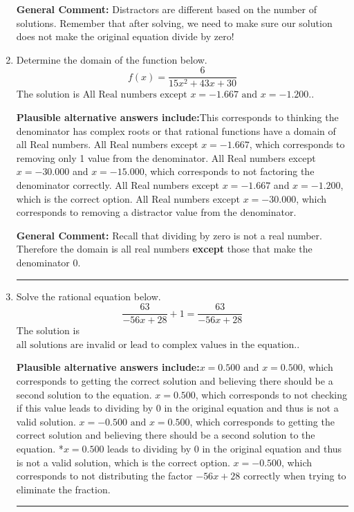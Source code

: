 \documentclass{extbook}[14pt]
\newcommand{\litem}[1]{\item #1

\rule{\textwidth}{0.4pt}}
\begin{document}
\begin{enumerate}
{\textbf{General Comment:} Distractors are different based on the number of solutions. Remember that after solving, we need to make sure our solution does not make the original equation divide by zero!
}
\litem{
Determine the domain of the function below.
\[ f(x) = \frac{6}{15x^{2} +43 x + 30} \]The solution is \( \text{All Real numbers except } x = -1.667 \text{ and } x = -1.200. \).\begin{enumerate}[label=\Alph*.]
\textbf{Plausible alternative answers include:}This corresponds to thinking the denominator has complex roots or that rational functions have a domain of all Real numbers.
All Real numbers except $x = -1.667$, which corresponds to removing only 1 value from the denominator.
All Real numbers except $x = -30.000$ and $x = -15.000$, which corresponds to not factoring the denominator correctly.
All Real numbers except $x = -1.667$ and $x = -1.200$, which is the correct option.
All Real numbers except $x = -30.000$, which corresponds to removing a distractor value from the denominator.
\end{enumerate}

\textbf{General Comment:} Recall that dividing by zero is not a real number. Therefore the domain is all real numbers \textbf{except} those that make the denominator 0.
}
\litem{
Solve the rational equation below.
\[ \frac{63}{-56x + 28} + 1 = \frac{63}{-56x + 28} \]The solution is \( \text{all solutions are invalid or lead to complex values in the equation.} \).\begin{enumerate}[label=\Alph*.]
\textbf{Plausible alternative answers include:}$x = 0.500 \text{ and } x = 0.500$, which corresponds to getting the correct solution and believing there should be a second solution to the equation.
$x = 0.500$, which corresponds to not checking if this value leads to dividing by 0 in the original equation and thus is not a valid solution.
$x = -0.500 \text{ and } x = 0.500$, which corresponds to getting the correct solution and believing there should be a second solution to the equation.
*$x = 0.500$ leads to dividing by 0 in the original equation and thus is not a valid solution, which is the correct option.
$x = -0.500$, which corresponds to not distributing the factor $-56x + 28$ correctly when trying to eliminate the fraction.
\end{enumerate}

}
\end{enumerate}
\end{document}
